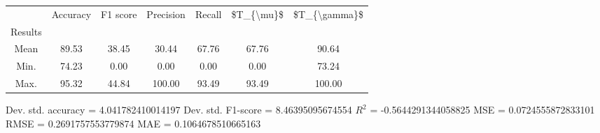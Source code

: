 \begin{tabular}{|c|c|c|c|c|c|c|}
\toprule
{} &  Accuracy &  F1 score &  Precision &  Recall &  \$T\_\{\textbackslash mu\}\$ &  \$T\_\{\textbackslash gamma\}\$ \\
Results &           &           &            &         &            &               \\
\hline
Mean    &     89.53 &     38.45 &      30.44 &   67.76 &      67.76 &         90.64 \\
Min.    &     74.23 &      0.00 &       0.00 &    0.00 &       0.00 &         73.24 \\
Max.    &     95.32 &     44.84 &     100.00 &   93.49 &      93.49 &        100.00 \\
\bottomrule
\end{tabular}

 Dev. std. accuracy = 4.041782410014197
 Dev. std. F1-score = 8.46395095674554
 $R^2$ = -0.5644291344058825
 MSE = 0.0724555872833101
 RMSE = 0.2691757553779874
 MAE = 0.1064678510665163